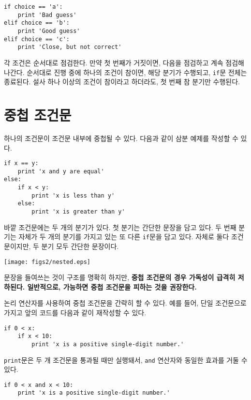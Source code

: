\beforeverb
\begin{verbatim}
if choice == 'a':
    print 'Bad guess'
elif choice == 'b':
    print 'Good guess'
elif choice == 'c':
    print 'Close, but not correct'
\end{verbatim}
\afterverb
%
각 조건은 순서대로 점검한다. 만약 첫 번째가 거짓이면, 다음을 점검하고 계속 점검해 나간다.
순서대로 진행 중에 하나의 조건이 참이면, 해당 분기가 수행되고, {\tt if}문 전체는 종료된다. 
설사 하나 이상의 조건이 참이라고 하더라도, 첫 번째 참 분기만 수행된다.

\section{중첩 조건문}

하나의 조건문이 조건문 내부에 중첩될 수 있다. 
다음과 같이 삼분 예제를 작성할 수 있다.

\beforeverb
\begin{verbatim}
if x == y:
    print 'x and y are equal'
else:
    if x < y:
        print 'x is less than y'
    else:
        print 'x is greater than y'
\end{verbatim}
\afterverb
%

바깥 조건문에는 두 개의 분기가 있다. 
첫 분기는 간단한 문장을 담고 있다. 
두 번째 분기는 자체가 두 개의 분기를 가지고 있는 또 다른 {\tt if}문을 담고 있다.
자체로 둘다 조건문이지만, 두 분기 모두 간단한 문장이다.

\beforefig
\centerline{\texttt{[image: figs2/nested.eps]}}
\afterfig

문장을 들여쓰는 것이 구조를 명확히 하지만, \bf{중첩 조건문}의 경우 가독성이 급격히 저하된다. 
일반적으로, 가능하면 중첩 조건문을 피하는 것을 권장한다.

논리 연산자를 사용하여 중첩 조건문을 간략히 할 수 있다. 
예를 들어, 단일 조건문으로 가지고 앞의 코드를 다음과 같이 재작성할 수 있다.

\beforeverb
\begin{verbatim}
if 0 < x:
    if x < 10:
        print 'x is a positive single-digit number.'
\end{verbatim}
\afterverb
%

{\tt print}문은 두 개 조건문을 통과될 때만 실행돼서, {\tt and} 연산자와 동일한 효과를 거둘 수 있다.

\beforeverb
\begin{verbatim}
if 0 < x and x < 10:
    print 'x is a positive single-digit number.'
\end{verbatim}
\afterverb


